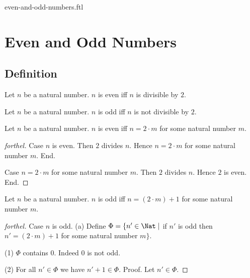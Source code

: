\documentclass{naproche-library}
\begin{document}
\begin{smodule}{even-and-odd-numbers.ftl}

  \section*{Even and Odd Numbers}

  \subsection*{Definition}

  \begin{definition}[forthel,id=ARITHMETIC_15_4521358965847512]
    Let $n$ be a natural number.
    $n$ is even iff $n$ is divisible by $2$.
  \end{definition}

  \begin{definition}[forthel,id=ARITHMETIC_15_1023652125874596]
    Let $n$ be a natural number.
    $n$ is odd iff $n$ is not divisible by $2$.
  \end{definition}

  \begin{proposition}[forthel,id=ARITHMETIC_15_0236985458752156]
    Let $n$ be a natural number.
    $n$ is even iff $n = 2 \cdot m$ for some natural number $m$.
  \end{proposition}
  \begin{proof}[forthel]
    Case $n$ is even.
      Then $2$ divides $n$.
      Hence $n = 2 \cdot m$ for some natural number $m$.
    End.

    Case $n = 2 \cdot m$ for some natural number $m$.
      Then $2$ divides $n$.
      Hence $2$ is even.
    End.
  \end{proof}

  \begin{proposition}[forthel,id=ARITHMETIC_15_1023512547854265]
    Let $n$ be a natural number.
    $n$ is odd iff $n = (2 \cdot m) + 1$ for some natural number $m$.
  \end{proposition}
  \begin{proof}[forthel]
    Case $n$ is odd.
      (a) Define $\Phi = \{ n' \in \Nat \mid$ if $n'$ is odd then $n' = (2 \cdot m) + 1$ for some natural number $m \}$.

      (1) $\Phi$ contains $0$.
      Indeed $0$ is not odd.

      (2) For all $n' \in \Phi$ we have $n' + 1 \in \Phi$. \newline
      Proof.
        Let $n' \in \Phi$.


\end{proof}
\end{smodule}
\end{document}
